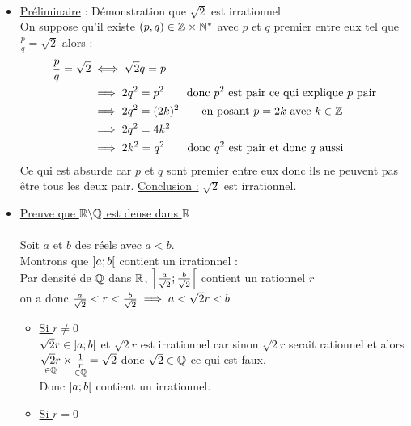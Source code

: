 \begin{dem} ~\\
    \begin{itemize}
        \item \underline{Préliminaire} : Démonstration que \(\sqrt{2}\) est irrationnel\\
        On suppose qu'il existe \((p,q) \in \mathbb{Z}\times\mathbb{N}^* \) avec \(p\) et \(q\) premier entre eux tel que \(\frac{p}{q} = \sqrt{2}\) alors : 
        \begin{align*}
            \frac{p}{q} = \sqrt{2} &\iff \sqrt{2}q = p \\
            &\implies 2q^2 = p^2 \qquad \text{donc } p^2 \text{ est pair ce qui explique } p \text{ pair}\\
            &\implies 2q^2 = (2k)^2 \qquad \text{en posant } p =2k \text{ avec } k \in \mathbb{Z} \\
            &\implies 2q^2 = 4k^2 \\
            &\implies 2k^2 = q^2 \qquad \text{donc } q^2 \text{ est pair et donc } q \text{ aussi} 
        \end{align*}
        Ce qui est absurde car \(p\) et \(q\) sont premier entre eux donc ils ne peuvent pas être tous les deux pair.
        \underline{Conclusion :} \(\sqrt{2}\) est irrationnel.
        \item \underline{Preuve que \(\mathbb{R}\backslash\mathbb{Q}\) est dense dans \(\mathbb{R}\)} \\~\\
        Soit \(a\) et \(b\) des réels avec \(a<b\).\\
        Montrons que \(\left]a;b\right[\) contient un irrationnel :\\
        Par densité de \(\mathbb{Q}\) dans \(\mathbb{R}\), \(\left]\frac{a}{\sqrt{2}};\frac{b}{\sqrt{2}}\right[\) contient un rationnel \(r\)\\
        on a donc \(\frac{a}{\sqrt{2}}<r<\frac{b}{\sqrt{2}} \implies a<\sqrt{2}r<b\)
        \begin{itemize}
            \item \underline{Si \(r\neq 0\)}\\
            \(\sqrt{2}r \in \left]a;b\right[\) et \(\sqrt{2}r\) est irrationnel car sinon \(\sqrt{2}r\) serait rationnel et alors \(\underset{\in \mathbb{Q}}{\sqrt{2}r} \times \underset{\in \mathbb{Q}}{\frac{1}{r}} = \sqrt{2}\) donc \(\sqrt{2} \in \mathbb{Q}\) ce qui est faux.\\
            Donc \(\left]a;b\right[\) contient un irrationnel.
            \item \underline{Si \(r = 0\)}\\

\end{itemize}
\end{itemize}
\end{dem}
